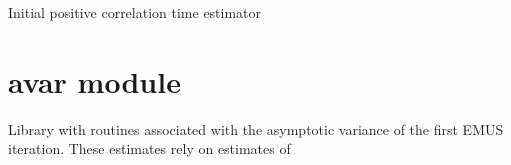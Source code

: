 \documentclass[letterpaper,10pt,english]{sphinxmanual}
\begin{document}

\begin{fulllineitems}
\label{modules/autocorrelation:autocorrelation.ipce}
Initial positive correlation time estimator

\end{fulllineitems}



\section{avar module}
\label{modules/avar:avar-module}\label{modules/avar::doc}\label{modules/avar:module-avar}
Library with routines associated with the asymptotic variance of the
first EMUS iteration.  These estimates rely on estimates of
\end{document}
